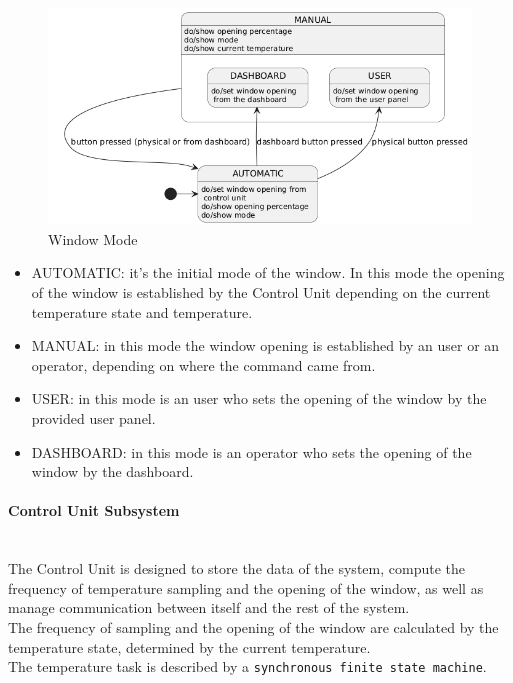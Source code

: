 \documentclass[a4paper,12pt]{report}
\begin{document}
            \begin{figure}[H]
                \centering{}
                \includegraphics[width=\textwidth]{uml/img/WindowModeUML.png}
                \caption{Window Mode}
                \label{img:window_mode}
            \end{figure}

            \begin{itemize}
                \item AUTOMATIC: it's the initial mode of the window. In this mode the opening of the window is established by the 
                Control Unit depending on the current temperature state and temperature. 
                \item MANUAL: in this mode the window opening is established by an user or an operator, depending on where the command 
                came from.
                \item USER: in this mode is an user who sets the opening of the window by the provided user panel.
                \item DASHBOARD: in this mode is an operator who sets the opening of the window by the dashboard.
            \end{itemize}

        \newpage
        \paragraph{Control Unit Subsystem\\}
            \ \\
            The Control Unit is designed to store the data of the system, compute the frequency of temperature sampling and the opening 
            of the window, as well as manage communication between itself and the rest of the system.\\
            The frequency of sampling and the opening of the window are calculated by the temperature state, determined by the current 
            temperature.\\
            The temperature task is described by a \texttt{synchronous finite state machine}. 
\end{document}
